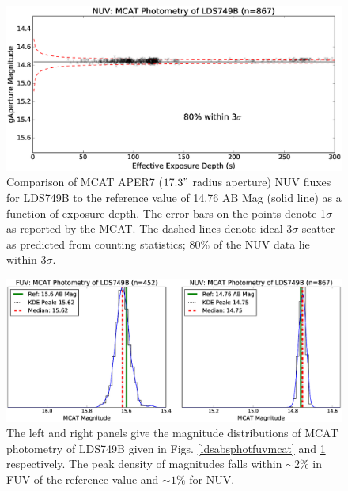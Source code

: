 \documentclass[preprint]{aastex}
\begin{document}
\begin{figure}
\includegraphics[scale=0.625]{Fig13.eps}
\caption{Comparison of MCAT APER7 ($17.3"$ radius aperture) NUV fluxes for LDS749B to the reference value of 14.76 AB Mag (solid line) as a function of exposure depth. The error bars on the points denote 1$\sigma$ as reported by the MCAT. The dashed lines denote ideal 3$\sigma$ scatter as predicted from counting statistics; 80\% of the NUV data lie within 3$\sigma$.
\label{ldsabsphotnuvmcat}}
\end{figure}


\begin{figure}
\includegraphics[scale=0.50]{Fig14.eps}
\caption{The left and right panels give the magnitude distributions of MCAT photometry of LDS749B given in Figs. \ref{ldsabsphotfuvmcat} and \ref{ldsabsphotnuvmcat} respectively. The peak density of magnitudes falls within $\sim 2$\% in FUV of the reference value and $\sim 1$\% for NUV.
\label{magdistmcat}}
\end{figure}
\end{document}
